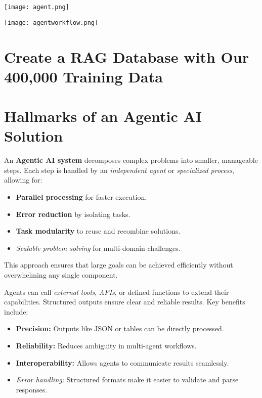 \texttt{[image: agent.png]}

\vspace{1cm}
\texttt{[image: agentworkflow.png]}

\section{Create a RAG Database with Our 400,000 Training Data}




\section{Hallmarks of an Agentic AI Solution}
\begin{tcolorbox}[title={1. Decomposition of Larger Problems into Smaller Steps}, colback=blue!5!white, colframe=blue!75!black]
An \textbf{Agentic AI system} decomposes complex problems into smaller, manageable steps. Each step is handled by an \textit{independent agent} or \textit{specialized process}, allowing for:  
\begin{itemize}
    \item \textbf{Parallel processing} for faster execution.
    \item \textbf{Error reduction} by isolating tasks.
    \item \textbf{Task modularity} to reuse and recombine solutions.
    \item \textit{Scalable problem solving} for multi-domain challenges.
\end{itemize}
This approach ensures that large goals can be achieved efficiently without overwhelming any single component.
\end{tcolorbox}
\vspace{0.5cm}
\begin{tcolorbox}[title={2. Use of Tools, Function Calling, and Structured Outputs}, colback=green!5!white, colframe=green!75!black]
Agents can call \textit{external tools}, \textit{APIs}, or defined functions to extend their capabilities. Structured outputs ensure clear and reliable results. Key benefits include:  
\begin{itemize}
    \item \textbf{Precision:} Outputs like JSON or tables can be directly processed.
    \item \textbf{Reliability:} Reduces ambiguity in multi-agent workflows.
    \item \textbf{Interoperability:} Allows agents to communicate results seamlessly.
    \item \textit{Error handling:} Structured formats make it easier to validate and parse responses.
\end{itemize}
\end{tcolorbox}
\vspace{0.5cm}

